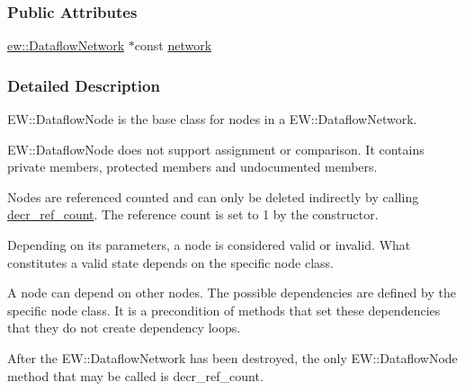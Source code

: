 \subsubsection*{Public Attributes}
\begin{DoxyCompactItemize}
\item 
\hyperlink{classew_1_1DataflowNetwork}{ew::DataflowNetwork} $\ast$const \hyperlink{classew_1_1DataflowNode_af3e8a9a18dac03806dda98ed1fcc79e9}{network}
\end{DoxyCompactItemize}


\subsubsection{Detailed Description}
EW::DataflowNode is the base class for nodes in a EW::DataflowNetwork.

EW::DataflowNode does not support assignment or comparison. It contains private members, protected members and undocumented members.

Nodes are referenced counted and can only be deleted indirectly by calling \hyperlink{classew_1_1DataflowNode_a7ee43d6c11ea87911ce0dbc16df0722a}{decr\_\-ref\_\-count}. The reference count is set to 1 by the constructor.

Depending on its parameters, a node is considered valid or invalid. What constitutes a valid state depends on the specific node class.

A node can depend on other nodes. The possible dependencies are defined by the specific node class. It is a precondition of methods that set these dependencies that they do not create dependency loops.

After the EW::DataflowNetwork has been destroyed, the only EW::DataflowNode method that may be called is decr\_\-ref\_\-count. 

